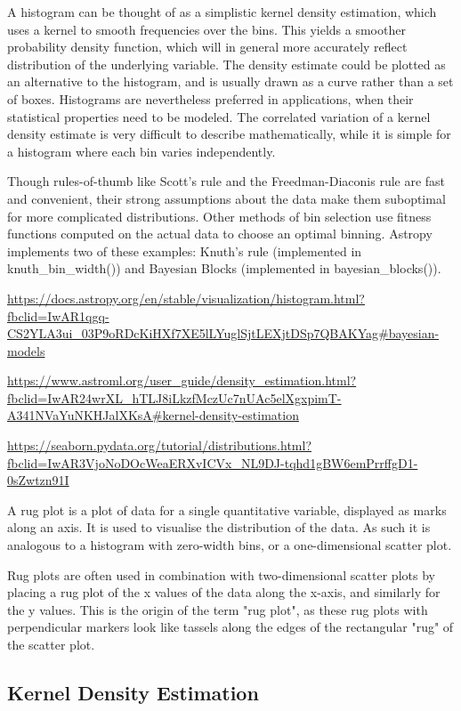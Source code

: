 A histogram can be thought of as a simplistic kernel density estimation, which uses a kernel to smooth frequencies over the bins. This yields a smoother probability density function, which will in general more accurately reflect distribution of the underlying variable. The density estimate could be plotted as an alternative to the histogram, and is usually drawn as a curve rather than a set of boxes. Histograms are nevertheless preferred in applications, when their statistical properties need to be modeled. The correlated variation of a kernel density estimate is very difficult to describe mathematically, while it is simple for a histogram where each bin varies independently. 

Though rules-of-thumb like Scott’s rule and the Freedman-Diaconis rule are fast and convenient, their strong assumptions about the data make them suboptimal for more complicated distributions. Other methods of bin selection use fitness functions computed on the actual data to choose an optimal binning. Astropy implements two of these examples: Knuth’s rule (implemented in knuth\_bin\_width()) and Bayesian Blocks (implemented in bayesian\_blocks()).

\url{https://docs.astropy.org/en/stable/visualization/histogram.html?fbclid=IwAR1qgq-CS2YLA3ui_03P9oRDcKiHXf7XE5lLYuglSjtLEXjtDSp7QBAKYag#bayesian-models}

\url{https://www.astroml.org/user_guide/density_estimation.html?fbclid=IwAR24wrXL_hTLJ8iLkzfMczUc7nUAc5elXgxpimT-A341NVaYuNKHJalXKsA#kernel-density-estimation}

\url{https://seaborn.pydata.org/tutorial/distributions.html?fbclid=IwAR3VjoNoDOcWeaERXvICVx_NL9DJ-tqhd1gBW6emPrrffgD1-0sZwtzn91I}


A rug plot is a plot of data for a single quantitative variable, displayed as marks along an axis. It is used to visualise the distribution of the data. As such it is analogous to a histogram with zero-width bins, or a one-dimensional scatter plot.

Rug plots are often used in combination with two-dimensional scatter plots by placing a rug plot of the x values of the data along the x-axis, and similarly for the y values. This is the origin of the term "rug plot", as these rug plots with perpendicular markers look like tassels along the edges of the rectangular "rug" of the scatter plot.

\subsection{Kernel Density Estimation}\label{sec:kde}

